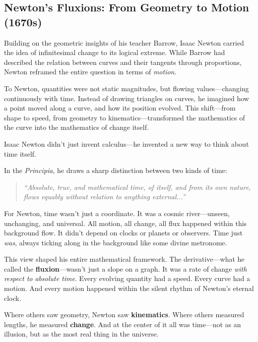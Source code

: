 \subsection{Newton’s Fluxions: From Geometry to Motion (1670s)}

Building on the geometric insights of his teacher Barrow, Isaac Newton carried the idea of infinitesimal change to its logical extreme. While Barrow had described the relation between curves and their tangents through proportions, Newton reframed the entire question in terms of \textit{motion}.

To Newton, quantities were not static magnitudes, but flowing values—changing continuously with time. Instead of drawing triangles on curves, he imagined how a point moved along a curve, and how its position evolved. This shift—from shape to speed, from geometry to kinematics—transformed the mathematics of the curve into the mathematics of change itself.

\begin{tcolorbox}[colback=gray!5!white, colframe=black, 
  title={Historical Sidebar: Newton’s Time—Absolute, Mathematical, and Always Flowing}, 
  fonttitle=\bfseries, arc=1.5mm, boxrule=0.4pt]
  
  Isaac Newton didn’t just invent calculus—he invented a new way to think about time itself.
  
  In the \textit{Principia}, he draws a sharp distinction between two kinds of time:
  \begin{quote}
  \textit{“Absolute, true, and mathematical time, of itself, and from its own nature, flows equably without relation to anything external...”}
  \end{quote}
  
  For Newton, time wasn’t just a coordinate. It was a cosmic river—unseen, unchanging, and universal. All motion, all change, all flux happened within this background flow. It didn’t depend on clocks or planets or observers. Time just \textit{was}, always ticking along in the background like some divine metronome.
  
  This view shaped his entire mathematical framework. The derivative—what he called the \textbf{fluxion}—wasn’t just a slope on a graph. It was a rate of change \textit{with respect to absolute time}. Every evolving quantity had a speed. Every curve had a motion. And every motion happened within the silent rhythm of Newton’s eternal clock.
  
  Where others saw geometry, Newton saw \textbf{kinematics}. Where others measured lengths, he measured \textbf{change}. And at the center of it all was time—not as an illusion, but as the most real thing in the universe.
  
\end{tcolorbox}


